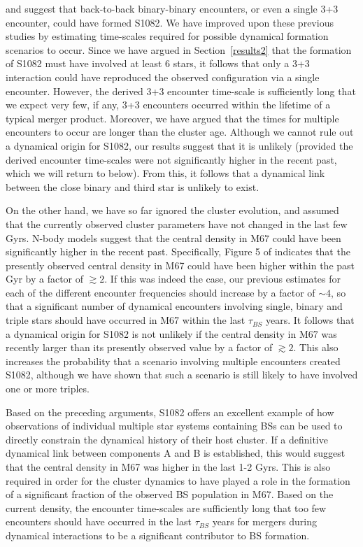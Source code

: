 \citet{vandenberg01} and \citet{sandquist03} suggest that
back-to-back binary-binary encounters, or even a single 3+3 encounter,
could have formed S1082.  We have
improved upon these previous studies by estimating time-scales required
for possible dynamical formation scenarios to occur.  
Since we have argued in Section~\ref{results2} that the
formation of S1082 must have involved at least 6 stars, it follows that 
only a 3+3 interaction could have reproduced the observed configuration
via a single encounter.  However, the derived 3+3 encounter time-scale
is sufficiently long that we expect very few, if any, 3+3 encounters
occurred within the lifetime of a typical merger product.  Moreover,
we have argued that the times for multiple encounters to occur are
longer than the cluster age.  Although we cannot rule out a dynamical
origin for S1082, our results suggest that it is unlikely (provided the
derived encounter time-scales were not significantly higher in the
recent past, which we will return to below).  From this, it follows that a
dynamical link between the close binary and third star is unlikely to
exist.   

On the other hand, we have so far ignored the cluster evolution,
and assumed that the currently observed cluster parameters have not
changed in the last few Gyrs.  N-body models suggest that the central
density in M67 could have been significantly higher in the recent
past.  Specifically, Figure 5 of \citet{hurley05} indicates that the
presently observed central density in M67 could have been higher
within the past Gyr by a factor of $\gtrsim 2$.  If this was indeed
the case, our previous estimates for each of the different encounter
frequencies should increase by a factor of $\sim 4$, so that a
significant number of dynamical encounters involving single, binary
and triple stars should have occurred in M67 within the last
$\tau_{BS}$ years.  It follows that a dynamical
origin for S1082 is not unlikely if the central density in M67 was 
recently larger than its presently observed value by a factor of
$\gtrsim 2$.  This also increases the 
probability that a scenario involving multiple encounters created
S1082, although we have shown that such a scenario is still likely to
have involved one or more triples.  

Based on the preceding arguments, S1082 offers an excellent example of
how observations of 
individual multiple star systems containing BSs can be used to
directly constrain the dynamical history of their host cluster.  
If a definitive dynamical link between components A and B is 
established, this would suggest that the central density in M67 
was higher in the last 1-2 Gyrs.  This is also required in order
for the cluster dynamics to have played a role in the formation of a
significant fraction of the observed BS population in M67.  Based on
the current density, the encounter time-scales are sufficiently long
that too few encounters should have occurred in the last $\tau_{BS}$
years for mergers during dynamical interactions to be a significant
contributor to BS formation.

